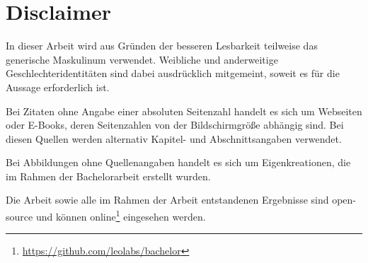 \chapter*{Disclaimer}

In dieser Arbeit wird aus Gründen der besseren Lesbarkeit teilweise das
generische Maskulinum verwendet. Weibliche und anderweitige
Geschlechteridentitäten sind dabei ausdrücklich mitgemeint, soweit es
für die Aussage erforderlich ist.

Bei Zitaten ohne Angabe einer absoluten Seitenzahl handelt es sich um
Webseiten oder E-Books, deren Seitenzahlen von der Bildschirmgröße
abhängig sind. Bei diesen Quellen werden alternativ Kapitel- und
Abschnittsangaben verwendet.

Bei Abbildungen ohne Quellenangaben handelt es sich um Eigenkreationen,
die im Rahmen der Bachelorarbeit erstellt wurden.

Die Arbeit sowie alle im Rahmen der Arbeit entstandenen Ergebnisse sind
open-source und können online\footnote{\url{https://github.com/leolabs/bachelor}}
eingesehen werden.